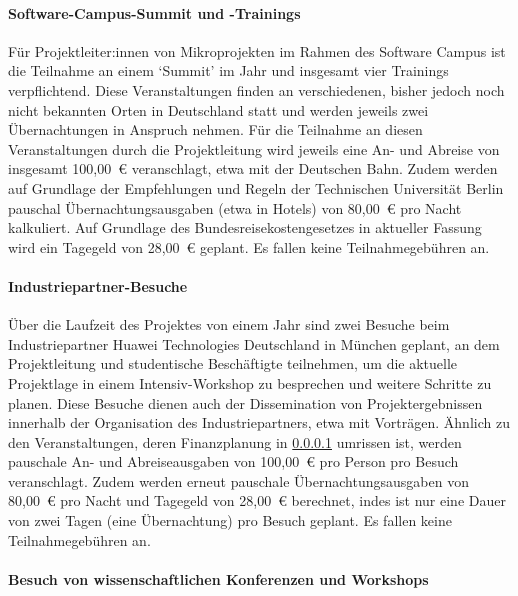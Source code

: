 \paragraph{Software-Campus-Summit und -Trainings}
\label{sec:finanz:reisen:swc}

Für Projektleiter:innen von Mikroprojekten im Rahmen des Software Campus ist die Teilnahme an einem `Summit' im Jahr und insgesamt vier Trainings verpflichtend.
Diese Veranstaltungen finden an verschiedenen, bisher jedoch noch nicht bekannten Orten in Deutschland statt und werden jeweils zwei Übernachtungen in Anspruch nehmen.
Für die Teilnahme an diesen Veranstaltungen durch die Projektleitung wird jeweils eine An- und Abreise von insgesamt 100,00~€ veranschlagt, etwa mit der Deutschen Bahn.
Zudem werden auf Grundlage der Empfehlungen und Regeln der Technischen Universität Berlin pauschal Übernachtungsausgaben (etwa in Hotels) von 80,00~€ pro Nacht kalkuliert.
Auf Grundlage des Bundesreisekostengesetzes in aktueller Fassung wird ein Tagegeld von 28,00~€ geplant.
Es fallen keine Teilnahmegebühren an.

\paragraph{Industriepartner-Besuche}
\label{sec:finanz:reisen:industriepartner}

Über die Laufzeit des Projektes von einem Jahr sind zwei Besuche beim Industriepartner Huawei Technologies Deutschland in München geplant, an dem Projektleitung und studentische Beschäftigte teilnehmen, um die aktuelle Projektlage in einem Intensiv-Workshop zu besprechen und weitere Schritte zu planen.
Diese Besuche dienen auch der Dissemination von Projektergebnissen innerhalb der Organisation des Industriepartners, etwa mit Vorträgen.
Ähnlich zu den Veranstaltungen, deren Finanzplanung in \cref{sec:finanz:reisen:swc} umrissen ist, werden pauschale An- und Abreiseausgaben von 100,00~€ pro Person pro Besuch veranschlagt.
Zudem werden erneut pauschale Übernachtungsausgaben von 80,00~€ pro Nacht und Tagegeld von 28,00~€ berechnet, indes ist nur eine Dauer von zwei Tagen (eine Übernachtung) pro Besuch geplant.
Es fallen keine Teilnahmegebühren an.

\paragraph{Besuch von wissenschaftlichen Konferenzen und Workshops}
\label{sec:finanz:reisen:konferenzen}

